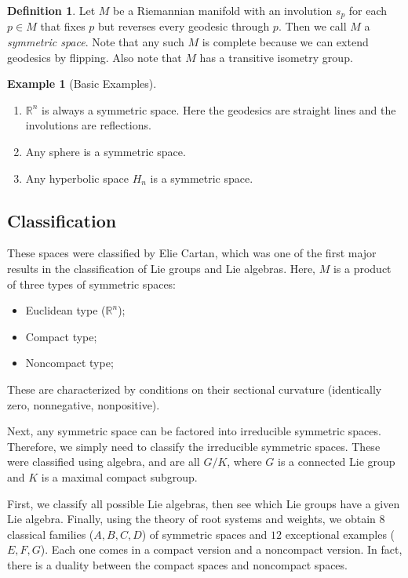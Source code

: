\documentclass[leqno, openany]{memoir}
\theoremstyle{definition}
\newtheorem{defn}[thm]{Definition}
\newtheorem{exm}[thm]{Example}
\theoremstyle{remark}
\theoremstyle{plain}
\theoremstyle{definition}
\theoremstyle{remark}
\newcommand{\R}{\mathbb{R}}
\begin{document}
\begin{defn}
    Let $M$ be a Riemannian manifold with an involution $s_p$ for each $p \in M$ that fixes $p$ but reverses every geodesic through $p$. Then we call $M$ a \textit{symmetric space}. Note that any such $M$ is complete because we can extend geodesics by flipping. Also note that $M$ has a transitive isometry group.
\end{defn}

\begin{exm}[Basic Examples]
    \begin{enumerate}
        \item $\R^n$ is always a symmetric space. Here the geodesics are straight lines and the involutions are reflections.
        \item Any sphere is a symmetric space.
        \item Any hyperbolic space $H_n$ is a symmetric space.
    \end{enumerate}
\end{exm}

\subsection{Classification}%
\label{sub:classification}

These spaces were classified by Elie Cartan, which was one of the first major results in the classification of Lie groups and Lie algebras. Here, $M$ is a product of three types of symmetric spaces:
\begin{itemize}
    \item Euclidean type ($\R^n$);
    \item Compact type;
    \item Noncompact type;
\end{itemize}
These are characterized by conditions on their sectional curvature (identically zero, nonnegative, nonpositive).

Next, any symmetric space can be factored into irreducible symmetric spaces. Therefore, we simply need to classify the irreducible symmetric spaces. These were classified using algebra, and are all $G/K$, where $G$ is a connected Lie group and $K$ is a maximal compact subgroup.

First, we classify all possible Lie algebras, then see which Lie groups have a given Lie algebra. Finally, using the theory of root systems and weights, we obtain $8$ classical families ($A,B,C,D$) of symmetric spaces and $12$ exceptional examples ($E,F,G$). Each one comes in a compact version and a noncompact version. In fact, there is a duality between the compact spaces and noncompact spaces.
\end{document}
